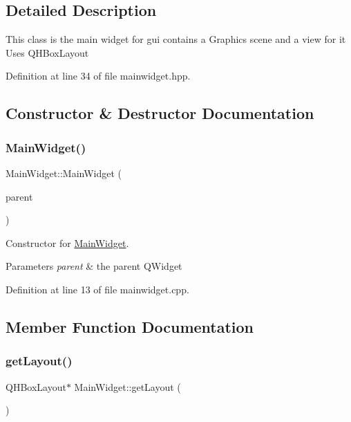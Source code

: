 \subsection{Detailed Description}
This class is the main widget for gui contains a Graphics scene and a view for it Uses Q\+H\+Box\+Layout 

Definition at line 34 of file mainwidget.\+hpp.



\subsection{Constructor \& Destructor Documentation}
\mbox{\label{classMainWidget_a62f5aa5fe2314c6221ac49b328b72e8b}} 
\subsubsection{\texorpdfstring{Main\+Widget()}{MainWidget()}}
{\footnotesize\ttfamily Main\+Widget\+::\+Main\+Widget (\begin{DoxyParamCaption}\item[{Q\+Widget $\ast$}]{parent }\end{DoxyParamCaption})}



Constructor for \mbox{\hyperlink{classMainWidget}{Main\+Widget}}. 


\begin{DoxyParams}{Parameters}
{\em parent} & the parent Q\+Widget \\
\hline
\end{DoxyParams}


Definition at line 13 of file mainwidget.\+cpp.



\subsection{Member Function Documentation}
\mbox{\label{classMainWidget_a639b465bb49eb31e1c09051ae047951f}} 
\subsubsection{\texorpdfstring{get\+Layout()}{getLayout()}}
{\footnotesize\ttfamily Q\+H\+Box\+Layout$\ast$ Main\+Widget\+::get\+Layout (\begin{DoxyParamCaption}{ }\end{DoxyParamCaption})\hspace{0.3cm}{\ttfamily [inline]}}



